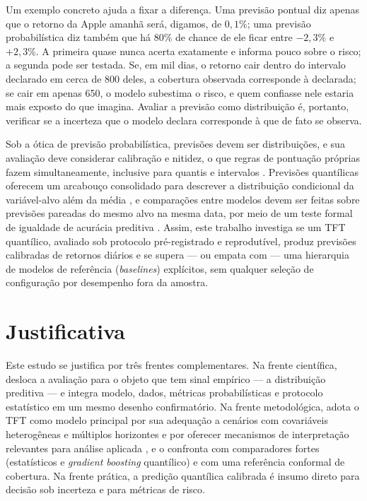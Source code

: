 Um exemplo concreto ajuda a fixar a diferença. Uma previsão pontual diz apenas que o retorno da Apple amanhã será, digamos, de \(0{,}1\%\); uma previsão probabilística diz também que há 80\% de chance de ele ficar entre \(-2{,}3\%\) e \(+2{,}3\%\). A primeira quase nunca acerta exatamente e informa pouco sobre o risco; a segunda pode ser testada. Se, em mil dias, o retorno cair dentro do intervalo declarado em cerca de 800 deles, a cobertura observada corresponde à declarada; se cair em apenas 650, o modelo subestima o risco, e quem confiasse nele estaria mais exposto do que imagina. Avaliar a previsão como distribuição é, portanto, verificar se a incerteza que o modelo declara corresponde à que de fato se observa.

Sob a ótica de previsão probabilística, previsões devem ser distribuições, e sua avaliação deve considerar calibração e nitidez, o que regras de pontuação próprias fazem simultaneamente, inclusive para quantis e intervalos \cite{GNEITING2007}. Previsões quantílicas oferecem um arcabouço consolidado para descrever a distribuição condicional da variável-alvo além da média \cite{KOENKERBASSETT1978,KOENKER2005}, e comparações entre modelos devem ser feitas sobre previsões pareadas do mesmo alvo na mesma data, por meio de um teste formal de igualdade de acurácia preditiva \cite{DIEBOLDMARIANO1995}. Assim, este trabalho investiga se um TFT quantílico, avaliado sob protocolo pré-registrado e reprodutível, produz previsões calibradas de retornos diários e se supera --- ou empata com --- uma hierarquia de modelos de referência (\textit{baselines}) explícitos, sem qualquer seleção de configuração por desempenho fora da amostra.

\section{Justificativa}
Este estudo se justifica por três frentes complementares. Na frente científica, desloca a avaliação para o objeto que tem sinal empírico --- a distribuição preditiva --- e integra modelo, dados, métricas probabilísticas e protocolo estatístico em um mesmo desenho confirmatório. Na frente metodológica, adota o TFT como modelo principal por sua adequação a cenários com covariáveis heterogêneas e múltiplos horizontes e por oferecer mecanismos de interpretação relevantes para análise aplicada \cite{LIMETAL2021TFT}, e o confronta com comparadores fortes (estatísticos e \textit{gradient boosting} quantílico) e com uma referência conformal de cobertura. Na frente prática, a predição quantílica calibrada é insumo direto para decisão sob incerteza e para métricas de risco.

